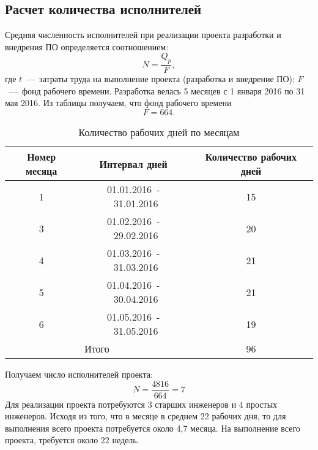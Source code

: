     \subsection{Расчет количества исполнителей}
    \label{subsec:slaves}
        Средняя численность исполнителей при реализации проекта разработки и внедрения ПО определяется соотношением:
        $$N=\dfrac {Q_p} {F},$$
        где $t$~---~затраты труда на выполнение проекта (разработка и внедрение ПО); $F$~---~фонд рабочего времени.
        Разработка велась 5 месяцев с 1 января 2016 по 31 мая 2016.
        Из таблицы получаем, что фонд рабочего времени $$F=664.$$
        \begin{table}[h!]
            \caption{Количество рабочих дней по месяцам}
            \centering
            \label{tabular:work_days}
            \begin{tabular}{|c|c|c|}
                \hline
                \bf{Номер месяца} & \bf{Интервал дней}& \bf{Количество рабочих дней} \\ \hline
                1 & 01.01.2016~-~31.01.2016 & 15 \\ \hline
                3 & 01.02.2016~-~29.02.2016 & 20 \\ \hline
                4 & 01.03.2016~-~31.03.2016 & 21 \\ \hline
                5 & 01.04.2016~-~30.04.2016 & 21 \\ \hline
                6 & 01.05.2016~-~31.05.2016 & 19 \\ \hline
                \multicolumn{2}{|c|}{Итого} & 96 \\ \hline
            \end{tabular}
        \end{table}
        Получаем число исполнителей проекта:
        $$N=\dfrac{4816}{664}=7$$
        Для реализации проекта потребуются 3 старших инженеров и 4 простых инженеров.
        Исходя из того, что в месяце в среднем 22 рабочих дня, то для выполнения
        всего проекта потребуется около 4,7 месяца. На выполнение всего проекта,
        требуется около 22 недель.

